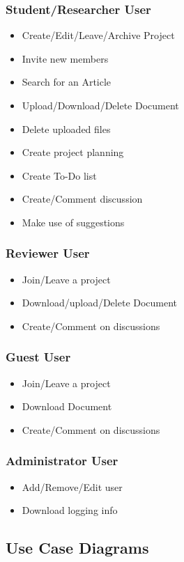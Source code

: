 \subsubsection{Student/Researcher User} 
\begin{itemize}
	\item Create/Edit/Leave/Archive Project
	\item Invite new members
	\item Search for an Article
	\item Upload/Download/Delete Document
	\item Delete uploaded files
	\item Create project planning
	\item Create To-Do list
	\item Create/Comment discussion
	\item Make use of suggestions
\end{itemize}
\subsubsection{Reviewer User} 
\begin{itemize}
	\item Join/Leave a project
	\item Download/upload/Delete Document
	\item Create/Comment on discussions
\end{itemize}

\subsubsection{Guest User} 
\begin{itemize}
	\item Join/Leave a project
	\item Download Document
	\item Create/Comment on discussions
\end{itemize}	

\subsubsection{Administrator User} 
\begin{itemize}
	\item Add/Remove/Edit user	
	\item Download logging info
\end{itemize}

\subsection{Use Case Diagrams} %
